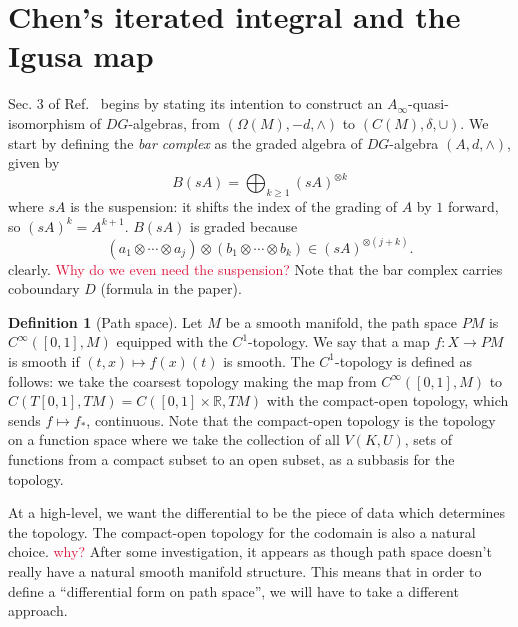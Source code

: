 \documentclass[aps,pra,showpacs,notitlepage,onecolumn,superscriptaddress,nofootinbib]{revtex4-1}
\newcommand{\pop}[1]{\textcolor{crimson}{#1}}
\theoremstyle{definition}
\newtheorem{definition}{Definition}[section]
\begin{document}
\section{Chen's iterated integral and the Igusa map}

\noindent Sec. 3 of Ref.~\cite{a_infty} begins by stating its intention to construct an $A_{\infty}$-quasi-isomorphism of $DG$-algebras, from $(\Omega(M), -d, \wedge)$ to $(C(M), \delta, \cup)$.
We start by defining the \emph{bar complex} as the graded algebra of $DG$-algebra $(A, d, \wedge)$, given by
\begin{equation}
    B(sA) = \bigoplus_{k \geq 1} (sA)^{\otimes k}
\end{equation}
where $sA$ is the suspension: it shifts the index of the grading of $A$ by $1$ forward, so $(sA)^{k} = A^{k + 1}$. $B(sA)$ is graded because
\begin{equation}
    (a_1 \otimes \cdots \otimes a_{j}) \otimes (b_1 \otimes \cdots \otimes b_k) \in (sA)^{\otimes (j + k)}.
\end{equation}
clearly. \pop{Why do we even need the suspension?} Note that the bar complex carries coboundary $D$ (formula in the paper).

\begin{definition}[Path space]
    Let $M$ be a smooth manifold, the path space $PM$ is $C^{\infty}([0, 1], M)$ equipped with the $C^1$-topology. We say that a map $f : X \rightarrow PM$ 
    is smooth if $(t, x) \mapsto f(x)(t)$ is smooth. The $C^1$-topology is defined as follows: we take the coarsest topology making the map 
    from $C^{\infty}([0, 1], M)$ to $C(T[0, 1], TM) = C([0, 1] \times \mathbb{R}, TM)$ with the compact-open topology, which sends $f \mapsto f_{*}$, continuous.
    Note that the compact-open topology is the topology on a function space where we take the collection of all $V(K, U)$, sets of functions 
    from a compact subset to an open subset, as a subbasis for the topology.
\end{definition}

\noindent At a high-level, we want the differential to be the piece of data which determines the topology. The compact-open topology for the codomain is also a natural choice. \pop{why?}
After some investigation, it appears as though path space doesn't really have a natural smooth manifold structure. This means that in order to define a ``differential form on path space'', 
we will have to take a different approach.
\end{document}
